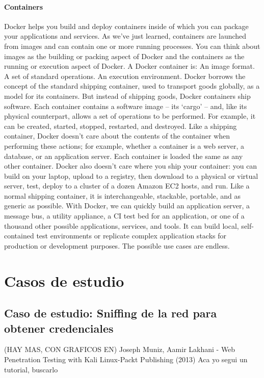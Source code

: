 \paragraph{Containers}
Docker helps you build and deploy containers inside of which you can
package your applications and services. As we’ve just learned, containers
are launched from images and can contain one or more running processes.
You can think about images as the building or packing aspect of Docker and
the containers as the running or execution aspect of Docker.
A Docker container is:
An image format.
A set of standard operations.
An execution environment.
Docker borrows the concept of the standard shipping container, used to
transport goods globally, as a model for its containers. But instead of
shipping goods, Docker containers ship software.
Each container contains a software image – its ‘cargo’ – and, like its
physical counterpart, allows a set of operations to be performed. For
example, it can be created, started, stopped, restarted, and destroyed.
Like a shipping container, Docker doesn’t care about the contents of the
container when performing these actions; for example, whether a container
is a web server, a database, or an application server. Each container is
loaded the same as any other container.
Docker also doesn’t care where you ship your container: you can build on
your laptop, upload to a registry, then download to a physical or virtual
server, test, deploy to a cluster of a dozen Amazon EC2 hosts, and run. Like
a normal shipping container, it is interchangeable, stackable, portable, and
as generic as possible.
With Docker, we can quickly build an application server, a message bus, a
utility appliance, a CI test bed for an application, or one of a thousand other
possible applications, services, and tools. It can build local, self-contained
test environments or replicate complex application stacks for production or
development purposes. The possible use cases are endless.
   \section{Casos de estudio}
\subsection{Caso de estudio: Sniffing de la red para obtener credenciales}
(HAY MAS, CON GRAFICOS EN)
Joseph Muniz, Aamir Lakhani - Web Penetration Testing with Kali Linux-Packt Publishing (2013)
Aca yo segui un tutorial, buscarlo

